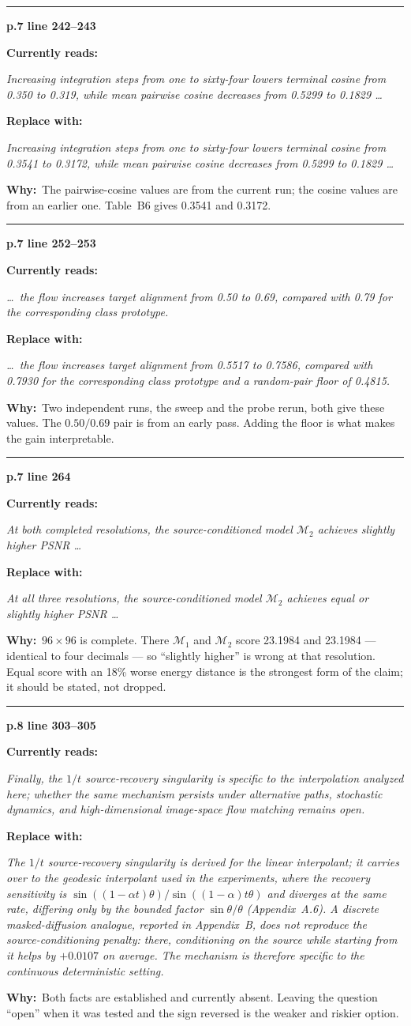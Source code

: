 \documentclass[11pt]{article}
\newcommand{\M}{\mathcal M}
\newcommand{\LOC}[2]{\medskip\noindent\textcolor{hd}{\rule{\textwidth}{0.6pt}}\par
  \noindent\textbf{\large p.#1 \quad line #2}\par\smallskip}
\newcommand{\WRONG}[1]{\noindent\textcolor{bad}{\textbf{Currently reads:}}\par
  \noindent\begingroup\itshape #1\endgroup\par\smallskip}
\newcommand{\RIGHT}[1]{\noindent\textcolor{good}{\textbf{Replace with:}}\par
  \noindent\begingroup\itshape #1\endgroup\par\smallskip}
\newcommand{\WHY}[1]{\noindent\textbf{Why:}\ #1\par}
\begin{document}
\LOC{7}{242--243}
\WRONG{Increasing integration steps from one to sixty-four lowers terminal cosine from 0.350 to
0.319, while mean pairwise cosine decreases from 0.5299 to 0.1829 \dots}
\RIGHT{Increasing integration steps from one to sixty-four lowers terminal cosine from 0.3541 to
0.3172, while mean pairwise cosine decreases from 0.5299 to 0.1829 \dots}
\WHY{The pairwise-cosine values are from the current run; the cosine values are from an earlier
one. Table~B6 gives 0.3541 and 0.3172.}

\LOC{7}{252--253}
\WRONG{\dots\ the flow increases target alignment from 0.50 to 0.69, compared with 0.79 for the
corresponding class prototype.}
\RIGHT{\dots\ the flow increases target alignment from 0.5517 to 0.7586, compared with 0.7930 for
the corresponding class prototype and a random-pair floor of 0.4815.}
\WHY{Two independent runs, the sweep and the probe rerun, both give these values. The $0.50/0.69$
pair is from an early pass. Adding the floor is what makes the gain interpretable.}

\LOC{7}{264}
\WRONG{At both completed resolutions, the source-conditioned model $\M_2$ achieves slightly
higher PSNR \dots}
\RIGHT{At all three resolutions, the source-conditioned model $\M_2$ achieves equal or slightly
higher PSNR \dots}
\WHY{$96\times96$ is complete. There $\M_1$ and $\M_2$ score 23.1984 and 23.1984 --- identical to
four decimals --- so ``slightly higher'' is wrong at that resolution. Equal score with an
18\% worse energy distance is the strongest form of the claim; it should be stated, not dropped.}

\LOC{8}{303--305}
\WRONG{Finally, the $1/t$ source-recovery singularity is specific to the interpolation analyzed
here; whether the same mechanism persists under alternative paths, stochastic dynamics, and
high-dimensional image-space flow matching remains open.}
\RIGHT{The $1/t$ source-recovery singularity is derived for the linear interpolant; it carries
over to the geodesic interpolant used in the experiments, where the recovery sensitivity is
$\sin((1-\alpha t)\theta)/\sin((1-\alpha)t\theta)$ and diverges at the same rate, differing only
by the bounded factor $\sin\theta/\theta$ (Appendix~A.6). A discrete masked-diffusion analogue,
reported in Appendix~B, does \emph{not} reproduce the source-conditioning penalty: there,
conditioning on the source while starting from it helps by $+0.0107$ on average. The mechanism is
therefore specific to the continuous deterministic setting.}
\WHY{Both facts are established and currently absent. Leaving the question ``open'' when it was
tested and the sign reversed is the weaker and riskier option.}
\end{document}
